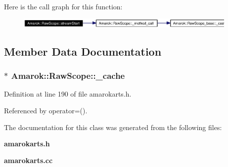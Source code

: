 Here is the call graph for this function:\begin{figure}[H]
\begin{center}
\leavevmode
\includegraphics[width=304pt]{classAmarok_1_1RawScope_Amarok_1_1RawScopea14_cgraph}
\end{center}
\end{figure}


\subsection{Member Data Documentation}
\subsubsection{$\ast$ {\bf Amarok::Raw\-Scope::\_\-cache}\hspace{0.3cm}{\tt  [private]}}\label{classAmarok_1_1RawScope_Amarok_1_1RawScoper0}




Definition at line 190 of file amarokarts.h.

Referenced by operator=().

The documentation for this class was generated from the following files:\begin{CompactItemize}
\item 
{\bf amarokarts.h}\item 
{\bf amarokarts.cc}\end{CompactItemize}
